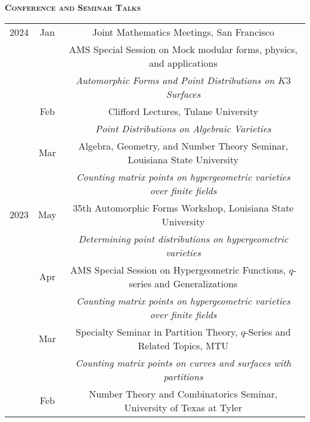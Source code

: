 \documentclass[11pt]{amsart}
\theoremstyle{remark}
\begin{document}
{\large{\textbf{\textsc{Conference and Seminar Talks}}}

\bgroup
\def\arraystretch{1.3}
\begin{tabular}{ c c c }
2024 & Jan &  \hspace{-2.6in}Joint Mathematics Meetings, San Francisco \\
     &     & \hspace{-0.65in} AMS Special Session on Mock modular forms, physics, and applications \\
     &     & \hspace{-1.4in}\textit{Automorphic Forms and Point Distributions on $K3$ Surfaces} \\
     & Feb & \hspace{-3.2in} Clifford Lectures, Tulane University \\
     &     & \hspace{-2.67in}\textit{Point Distributions on Algebraic Varieties} \\
	 &  Mar   & \hspace{-0.2in} Algebra, Geometry, and Number Theory Seminar, Louisiana State University \\
	 &     & \hspace{-0.85in}\textit{Counting matrix points on hypergeometric varieties over finite fields} \\
2023 & May & \hspace{-1.2in} 35th Automorphic Forms Workshop, Louisiana State University \\
     &     & \hspace{-1.45in}\textit{Determining point distributions on hypergeometric varieties} \\
     & Apr & AMS Special Session on Hypergeometric Functions, $q$-series and Generalizations \\
     &     & \hspace{-0.9in}\textit{Counting matrix points on hypergeometric varieties over finite fields} \\
     & Mar & \hspace{-0.45in}Specialty Seminar in Partition Theory, $q$-Series and Related Topics, MTU \\
     &     & \hspace{-1.4in}\textit{Counting matrix points on curves and surfaces with partitions} \\
     & Feb & \hspace{-0.53in} Number Theory and Combinatorics Seminar, University of Texas at Tyler \\

\end{tabular}}
\end{document}
